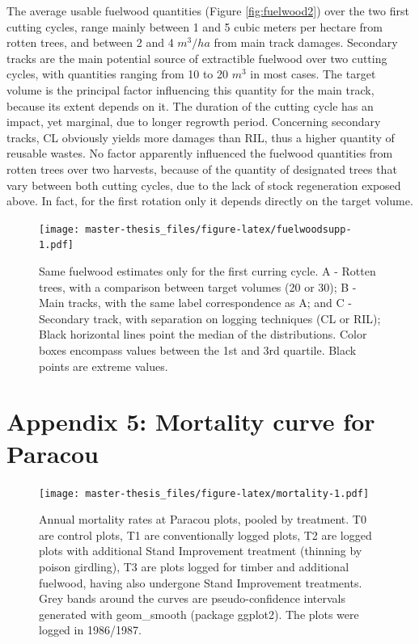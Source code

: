 \documentclass[12pt,]{article}
\let\oldsection\section
\renewcommand\section{\newpage\oldsection}
\theoremstyle{definition}
\theoremstyle{definition}
\theoremstyle{definition}
\theoremstyle{remark}
\begin{document}
The average usable fuelwood quantities (Figure \ref{fig:fuelwood2}) over
the two first cutting cycles, range mainly between 1 and 5 cubic meters
per hectare from rotten trees, and between 2 and 4 \(m^3/ha\) from main
track damages. Secondary tracks are the main potential source of
extractible fuelwood over two cutting cycles, with quantities ranging
from 10 to 20 \(m^3\) in most cases. The target volume is the principal
factor influencing this quantity for the main track, because its extent
depends on it. The duration of the cutting cycle has an impact, yet
marginal, due to longer regrowth period. Concerning secondary tracks, CL
obviously yields more damages than RIL, thus a higher quantity of
reusable wastes. No factor apparently influenced the fuelwood quantities
from rotten trees over two harvests, because of the quantity of
designated trees that vary between both cutting cycles, due to the lack
of stock regeneration exposed above. In fact, for the first rotation
only it depends directly on the target volume.

\begin{figure}
\centering
\texttt{[image: master-thesis\_files/figure-latex/fuelwoodsupp-1.pdf]}
\caption{\label{fig:fuelwoodsupp}Same fuelwood estimates only for the first
curring cycle. A - Rotten trees, with a comparison between target
volumes (20 or 30); B - Main tracks, with the same label correspondence
as A; and C - Secondary track, with separation on logging techniques (CL
or RIL); Black horizontal lines point the median of the distributions.
Color boxes encompass values between the 1st and 3rd quartile. Black
points are extreme values.}
\end{figure}

\section{Appendix 5: Mortality curve for
Paracou}\label{appendix-5-mortality-curve-for-paracou}

\begin{figure}
\centering
\texttt{[image: master-thesis\_files/figure-latex/mortality-1.pdf]}
\caption{\label{fig:mortality}Annual mortality rates at Paracou plots,
pooled by treatment. T0 are control plots, T1 are conventionally logged
plots, T2 are logged plots with additional Stand Improvement treatment
(thinning by poison girdling), T3 are plots logged for timber and
additional fuelwood, having also undergone Stand Improvement treatments.
Grey bands around the curves are pseudo-confidence intervals generated
with geom\_smooth (package ggplot2). The plots were logged in
1986/1987.}
\end{figure}
\end{document}
